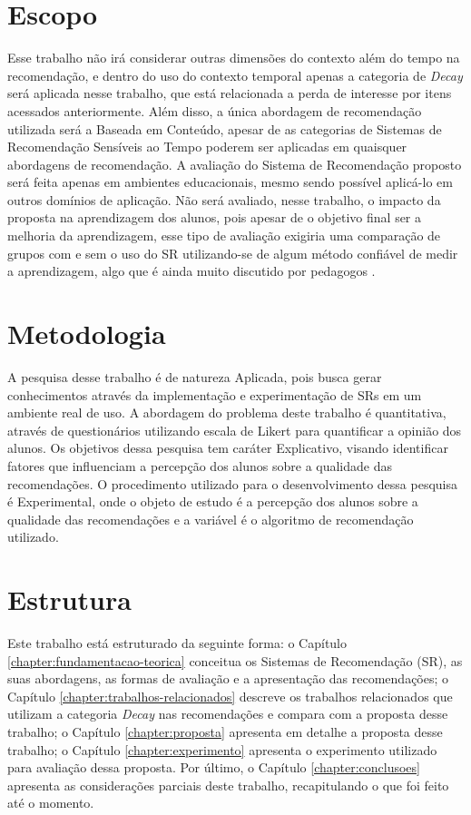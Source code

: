 \section{Escopo}

Esse trabalho não irá considerar outras dimensões do contexto além do tempo na recomendação, e dentro do uso do contexto
temporal apenas a categoria de \textit{Decay} será aplicada nesse trabalho, que está relacionada a perda de interesse por
itens acessados anteriormente. Além disso, a única abordagem de recomendação utilizada será a Baseada em Conteúdo,
apesar de as categorias de Sistemas de Recomendação Sensíveis ao Tempo poderem ser aplicadas em quaisquer abordagens de
recomendação. A avaliação do Sistema de Recomendação proposto será feita apenas em ambientes educacionais, mesmo sendo
possível aplicá-lo em outros domínios de aplicação. Não será avaliado, nesse trabalho, o impacto da proposta na
aprendizagem dos alunos, pois apesar de o objetivo final ser a melhoria da aprendizagem, esse tipo de avaliação exigiria uma
comparação de grupos com e sem o uso do SR utilizando-se de algum método confiável de medir a
aprendizagem, algo que é ainda muito discutido por pedagogos \cite{luckesi2014avaliaccao}.

\section{Metodologia}

A pesquisa desse trabalho é de natureza Aplicada, pois busca gerar conhecimentos através da implementação e experimentação
de SRs em um ambiente real de uso. A abordagem do problema deste trabalho é quantitativa, através de questionários utilizando
escala de Likert para quantificar a opinião dos alunos. Os objetivos dessa pesquisa tem caráter Explicativo, visando
identificar fatores que influenciam a percepção dos alunos sobre a qualidade das recomendações. O procedimento utilizado
para o desenvolvimento dessa pesquisa é Experimental, onde o objeto de estudo é a percepção dos alunos sobre a qualidade
das recomendações e a variável é o algoritmo de recomendação utilizado.

\section{Estrutura}

Este trabalho está estruturado da seguinte forma: o Capítulo \ref{chapter:fundamentacao-teorica} conceitua os Sistemas de
Recomendação (SR), as suas abordagens, as formas de avaliação e a apresentação das recomendações; o Capítulo \ref{chapter:trabalhos-relacionados}
descreve os trabalhos relacionados que utilizam a categoria \textit{Decay} nas recomendações e compara com a proposta desse
trabalho; o Capítulo \ref{chapter:proposta} apresenta em detalhe a proposta desse trabalho; o Capítulo \ref{chapter:experimento}
apresenta o experimento utilizado para avaliação dessa proposta. Por último, o Capítulo \ref{chapter:conclusoes} apresenta
as considerações parciais deste trabalho, recapitulando o que foi feito até o momento.


